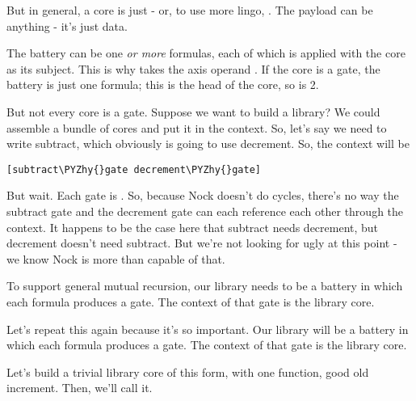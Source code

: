 But in general, a core is just  - or, to use more
lingo, .  The payload can be anything - it's
just data.

The battery can be one \emph{or more} formulas, each of which is
applied with the core as its subject.  This is why  takes the
axis operand .  If the core is a gate, the battery is just one
formula; this is the head of the core, so  is 2.

But not every core is a gate.  Suppose we want to build a
library?  We could assemble a bundle of cores and put it in
the context.  So, let's say we need to write subtract, which
obviously is going to use decrement.  So, the context will be

\begin{framed_shaded}
\begin{Verbatim}[fontsize=\relsize{-2.5},fontseries=b,commandchars=\\\{\}]
[subtract\PYZhy{}gate decrement\PYZhy{}gate]
\end{Verbatim}
\end{framed_shaded}
But wait.  Each gate is .  So, because
Nock doesn't do cycles, there's no way the subtract gate and the
decrement gate can each reference each other through the context.
It happens to be the case here that subtract needs decrement, but
decrement doesn't need subtract.  But we're not looking for ugly
at this point - we know Nock is more than capable of that.

To support general mutual recursion, our library needs to be a
battery in which each formula produces a gate.  The context of
that gate is the library core.

Let's repeat this again because it's so important.  Our library
will be a battery in which each formula produces a gate.  The
context of that gate is the library core.

Let's build a trivial library core of this form, with one
function, good old increment.  Then, we'll call it.

